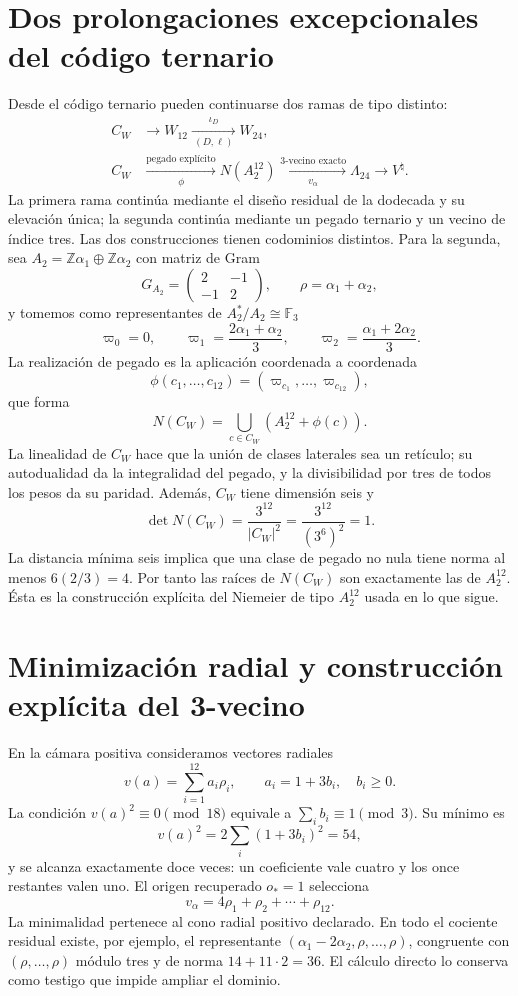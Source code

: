 \section{Dos prolongaciones excepcionales del código ternario}

Desde el código ternario pueden continuarse dos ramas de tipo distinto:
\[
\begin{aligned}
C_W&\longrightarrow W_{12}
\xrightarrow[\ (D,\ell)\ ]{\ \iota_D\ }W_{24},\\
C_W&\xrightarrow[\phi]{\text{pegado explícito}}N(A_2^{12})
\xrightarrow[v_\alpha]{\text{3-vecino exacto}}\Lambda_{24}
\longrightarrow V^\natural .
\end{aligned}
\]
La primera rama continúa mediante el diseño residual de la dodecada y su
elevación única; la segunda continúa mediante un pegado ternario y un vecino
de índice tres. Las dos construcciones tienen codominios distintos. Para la
segunda, sea \(A_2=\mathbb Z\alpha_1\oplus\mathbb Z\alpha_2\) con matriz
de Gram
\[
G_{A_2}=\begin{pmatrix}2&-1\\-1&2\end{pmatrix},
\qquad \rho=\alpha_1+\alpha_2,
\]
y tomemos como representantes de \(A_2^*/A_2\cong\mathbb F_3\)
\[
\varpi_0=0,\qquad
\varpi_1=\frac{2\alpha_1+\alpha_2}{3},\qquad
\varpi_2=\frac{\alpha_1+2\alpha_2}{3}.
\]
La realización de pegado es la aplicación coordenada a coordenada
\[
\phi(c_1,\ldots,c_{12})=(\varpi_{c_1},\ldots,\varpi_{c_{12}}),
\]
que forma
\[
N(C_W)=\bigcup_{c\in C_W}(A_2^{12}+\phi(c)).
\]
La linealidad de \(C_W\) hace que la unión de clases laterales sea un retículo; su
autodualidad da la integralidad del pegado, y la divisibilidad por tres de
todos los pesos da su paridad. Además, \(C_W\) tiene dimensión seis y
\[
\det N(C_W)=\frac{3^{12}}{|C_W|^2}
=\frac{3^{12}}{(3^6)^2}=1.
\]
La distancia mínima seis implica que una clase de pegado no nula tiene norma
al menos \(6(2/3)=4\). Por tanto las raíces de \(N(C_W)\) son exactamente las
de \(A_2^{12}\). Ésta es la construcción explícita del Niemeier de tipo
\(A_2^{12}\) usada en lo que sigue.

\section{Minimización radial y construcción explícita del 3-vecino}
\label{sec:vecino-leech-ejecutable}

En la cámara positiva consideramos vectores radiales
\[
v(a)=\sum_{i=1}^{12}a_i\rho_i,
\qquad a_i=1+3b_i,\quad b_i\ge0.
\]
La condición \(v(a)^2\equiv0\pmod{18}\) equivale a
\(\sum_i b_i\equiv1\pmod3\). Su mínimo es
\[
v(a)^2=2\sum_i(1+3b_i)^2=54,
\]
y se alcanza exactamente doce veces: un coeficiente vale cuatro y los once
restantes valen uno. El origen recuperado \(o_*=1\) selecciona
\[
v_\alpha=4\rho_1+\rho_2+\cdots+\rho_{12}.
\]
La minimalidad pertenece al cono radial positivo declarado. En todo el
cociente residual existe, por ejemplo, el representante
\((\alpha_1-2\alpha_2,\rho,\ldots,\rho)\), congruente con
\((\rho,\ldots,\rho)\) módulo tres y de norma \(14+11\cdot2=36\). El
cálculo directo lo conserva como testigo que impide ampliar el dominio.

